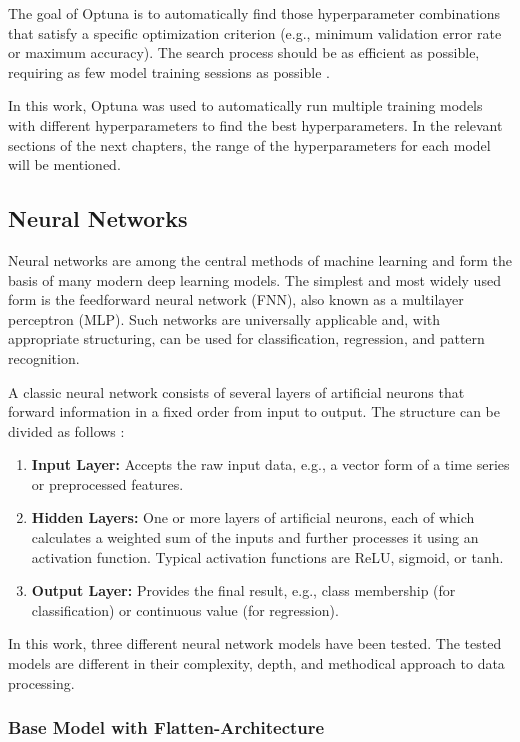 The goal of Optuna is to automatically find those hyperparameter combinations that satisfy a specific optimization criterion (e.g., minimum validation error rate or maximum accuracy). The search process should be as efficient as possible, requiring as few model training sessions as possible \cite{optuna-hyperparameters}.

In this work, Optuna was used to automatically run multiple training models with different hyperparameters to find the best hyperparameters. In the relevant sections of the next chapters, the range of the hyperparameters for each model will be mentioned.

\subsection{Neural Networks}

Neural networks are among the central methods of machine learning and form the basis of many modern deep learning models. The simplest and most widely used form is the feedforward neural network (FNN), also known as a multilayer perceptron (MLP). Such networks are universally applicable and, with appropriate structuring, can be used for classification, regression, and pattern recognition.


A classic neural network consists of several layers of artificial neurons that forward information in a fixed order from input to output. The structure can be divided as follows \cite{nn-basics}:

\begin{enumerate}
    \item \textbf{Input Layer:} Accepts the raw input data, e.g., a vector form of a time series or preprocessed features.
    \item \textbf{Hidden Layers:} One or more layers of artificial neurons, each of which calculates a weighted sum of the inputs and further processes it using an activation function. Typical activation functions are ReLU, sigmoid, or tanh.
    \item \textbf{Output Layer:} Provides the final result, e.g., class membership (for classification) or continuous value (for regression).
\end{enumerate}

In this work, three different neural network models have been tested. The tested models are different in their complexity, depth, and methodical approach to data processing.

\subsubsection{Base Model with Flatten-Architecture}


